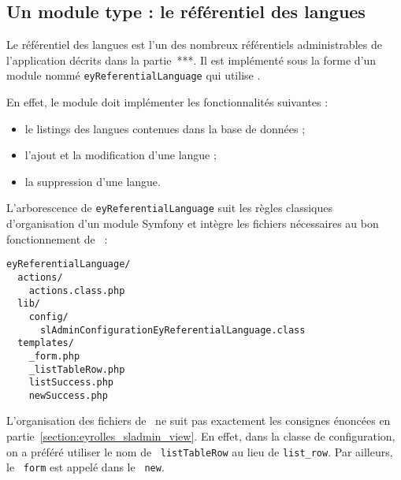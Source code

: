 \subsection{Un module type : le référentiel des langues}
\label{section:eyrolles_ref-langues}

Le référentiel des langues est l'un des nombreux référentiels administrables de l'application décrits dans la partie~***. Il est implémenté sous la forme d'un module nommé \texttt{eyReferentialLanguage} qui utilise \asladmin.

En effet, le module doit implémenter les fonctionnalités suivantes :
\begin{itemize}
\item le listings des langues contenues dans la base de données ;
\item l'ajout et la modification d'une langue ;
\item la suppression d'une langue.
\end{itemize}

L'arborescence de \texttt{eyReferentialLanguage} suit les règles classiques d'organisation d'un module Symfony et intègre les fichiers nécessaires au bon fonctionnement de \asladmin\ :
\begin{verbatim}
eyReferentialLanguage/
  actions/
    actions.class.php
  lib/
    config/
      slAdminConfigurationEyReferentialLanguage.class
  templates/
    _form.php
    _listTableRow.php
    listSuccess.php
    newSuccess.php
\end{verbatim}

L'organisation des fichiers de \atemplate\ ne suit pas exactement les consignes énoncées en partie~\ref{section:eyrolles_sladmin_view}. En effet, dans la classe de configuration, on a préféré utiliser le nom de \apartial\ \texttt{listTableRow} au lieu de \texttt{list\_row}. Par ailleurs, le \apartial\ \texttt{form} est appelé dans le \atemplate\ \texttt{new}.
